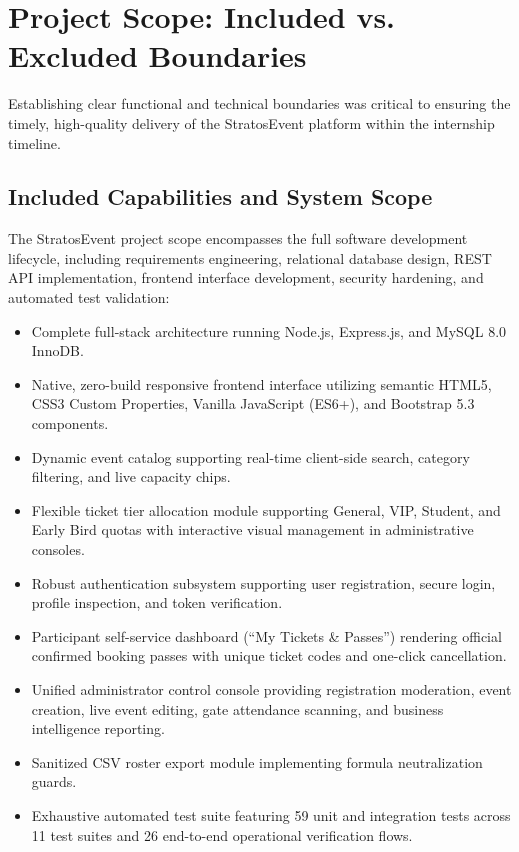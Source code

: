 \documentclass[11pt,a4paper]{report}
\begin{document}
\section{Project Scope: Included vs. Excluded Boundaries}
\justifying
Establishing clear functional and technical boundaries was critical to ensuring the timely, high-quality delivery of the StratosEvent platform within the internship timeline.

\subsection{Included Capabilities and System Scope}
The StratosEvent project scope encompasses the full software development lifecycle, including requirements engineering, relational database design, REST API implementation, frontend interface development, security hardening, and automated test validation:
\begin{itemize}[leftmargin=1.5em, itemsep=0.4em]
    \item Complete full-stack architecture running Node.js, Express.js, and MySQL 8.0 InnoDB.
    \item Native, zero-build responsive frontend interface utilizing semantic HTML5, CSS3 Custom Properties, Vanilla JavaScript (ES6+), and Bootstrap 5.3 components.
    \item Dynamic event catalog supporting real-time client-side search, category filtering, and live capacity chips.
    \item Flexible ticket tier allocation module supporting General, VIP, Student, and Early Bird quotas with interactive visual management in administrative consoles.
    \item Robust authentication subsystem supporting user registration, secure login, profile inspection, and token verification.
    \item Participant self-service dashboard (``My Tickets \& Passes'') rendering official confirmed booking passes with unique ticket codes and one-click cancellation.
    \item Unified administrator control console providing registration moderation, event creation, live event editing, gate attendance scanning, and business intelligence reporting.
    \item Sanitized CSV roster export module implementing formula neutralization guards.
    \item Exhaustive automated test suite featuring 59 unit and integration tests across 11 test suites and 26 end-to-end operational verification flows.
\end{itemize}
\end{document}
